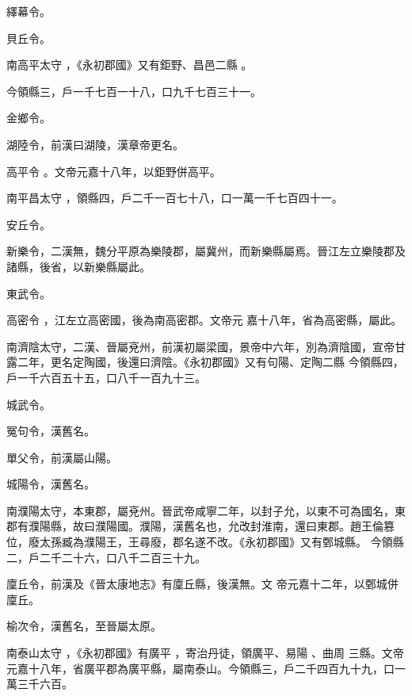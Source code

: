 \begin{pinyinscope}
繹幕令。


貝丘令。


南高平太守
 ，《永初郡國》又有鉅野、昌邑二縣
 。



 今領縣三，戶一千七百一十八，口九千七百三十一。


金鄉令。



 湖陸令，前漢曰湖陵，漢章帝更名。


高平令
 。文帝元嘉十八年，以鉅野併高平。


南平昌太守
 ，領縣四，戶二千一百七十八，口一萬一千七百四十一。


安丘令。



 新樂令，二漢無，魏分平原為樂陵郡，屬冀州，而新樂縣屬焉。晉江左立樂陵郡及諸縣，後省，以新樂縣屬此。


東武令。


高密令
 ，江左立高密國，後為南高密郡。文帝元
 嘉十八年，省為高密縣，屬此。


南濟陰太守，二漢、晉屬兗州，前漢初屬梁國，景帝中六年，別為濟陰國，宣帝甘露二年，更名定陶國，後還曰濟陰。《永初郡國》又有句陽、定陶二縣
 今領縣四，戶一千六百五十五，口八千一百九十三。


城武令。



 冤句令，漢舊名。



 單父令，前漢屬山陽。



 城陽令，漢舊名。


南濮陽太守，本東郡，屬兗州。晉武帝咸寧二年，以封子允，以東不可為國名，東郡有濮陽縣，故曰濮陽國。濮陽，漢舊名也，允改封淮南，還曰東郡。趙王倫篡位，廢太孫臧為濮陽王，王尋廢，郡名遂不改。《永初郡國》又有鄄城縣。
 今領縣二，戶二千二十六，口八千二百三十九。



 廩丘令，前漢及《晉太康地志》有廩丘縣，後漢無。文
 帝元嘉十二年，以鄄城併廩丘。



 榆次令，漢舊名，至晉屬太原。


南泰山太守
 ，《永初郡國》有廣平
 ，寄治丹徒，領廣平、易陽
 、曲周
 三縣。文帝元嘉十八年，省廣平郡為廣平縣，屬南泰山。今領縣三，戶二千四百九十九，口一萬三千六百。



\end{pinyinscope}

